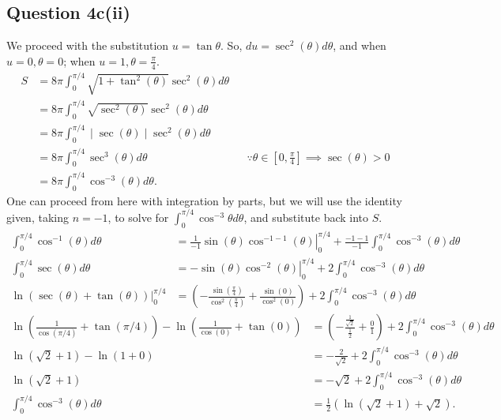 \documentclass[12pt]{article}
\begin{document}
\subsection*{Question 4c(ii)}
We proceed with the substitution $u=\tan\theta$. So, $du=\sec^2(\theta)d\theta$, and when $u=0,\theta=0$; when $u=1,\theta=\frac{\pi}{4}$.
\begin{align*}
    S &= 8\pi\int_0^{\pi/4}\sqrt{1+\tan^2(\theta)}\sec^2(\theta) d\theta\\
    &= 8\pi\int_0^{\pi/4}\sqrt{\sec^2(\theta)}\sec^2(\theta) d\theta\\
    &= 8\pi\int_0^{\pi/4}\mid\sec(\theta)\mid \sec^2(\theta) d\theta\\
    &= 8\pi\int_0^{\pi/4}\sec^3(\theta) d\theta &&\because \theta\in\left[0,\frac{\pi}{4}\right]\implies \sec(\theta)>0\\
    &= 8\pi \int_0^{\pi/4}\cos^{-3}(\theta) d\theta. 
\end{align*}
One can proceed from here with integration by parts, but we will use the identity given, taking $n=-1$, to solve for $\int_0^{\pi/4}\cos^{-3}\theta d\theta$, and substitute back into $S$.
\begin{align*}
    \int_0^{\pi/4}\cos^{-1}(\theta) d\theta &= \left.\frac{1}{-1}\sin(\theta)\cos^{-1-1}(\theta)\right|_0^{\pi/4}+\frac{-1-1}{-1}\int_0^{\pi/4}\cos^{-3}(\theta) d\theta\\
    \int_0^{\pi/4}\sec(\theta) d\theta &= \left.-\sin(\theta)\cos^{-2}(\theta) \right|_0^{\pi/4}+2\int_0^{\pi/4}\cos^{-3}(\theta) d\theta\\
    \left.\ln\left(\sec(\theta)+\tan(\theta)\right)\right|_0^{\pi/4} &= \left(-\frac{\sin(\frac\pi 4)}{\cos^2(\frac\pi 4)}+\frac{\sin(0)}{\cos^2(0)}\right)+2\int_0^{\pi/4}\cos^{-3}(\theta) d\theta
\end{align*}
\begin{align*}
    \ln\left(\frac{1}{\cos(\pi/4)}+\tan(\pi/4)\right) - \ln\left(\frac{1}{\cos(0)}+\tan(0)\right) &= \left(-\frac{\frac{1}{\sqrt{2}}}{\frac{1}{2}}+\frac{0}{1}\right)+2\int_0^{\pi/4}\cos^{-3}(\theta) d\theta\\
    \ln(\sqrt{2}+1)-\ln(1+0)&=-\frac{2}{\sqrt{2}}+2\int_0^{\pi/4}\cos^{-3}(\theta) d\theta\\
    \ln(\sqrt{2}+1)&=-\sqrt{2}+2\int_0^{\pi/4}\cos^{-3}(\theta) d\theta\\
    \int_0^{\pi/4}\cos^{-3}(\theta) d\theta &= \frac{1}{2}(\ln(\sqrt{2}+1)+\sqrt{2}).
\end{align*}
\end{document}

